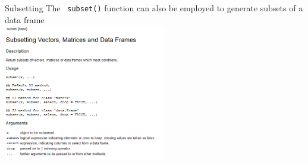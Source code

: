 \documentclass[11pt,german,hideothersubsections]{beamer}\usepackage[]{graphicx}\usepackage[]{color}
\newcommand{\R}[1]{{\tt \color{blue}  #1}}
\begin{document}
\begin{frame}[fragile]{Subsetting}
\footnotesize{
The \R{subset()} function can also be employed to generate subsets of a data frame\\
\vspace{.5cm}
\includegraphics[width=.75\textwidth, height=6cm]{../../../tutorial/graphs/FunctionSubset.PNG}\\
}
\end{frame}
\end{document}
